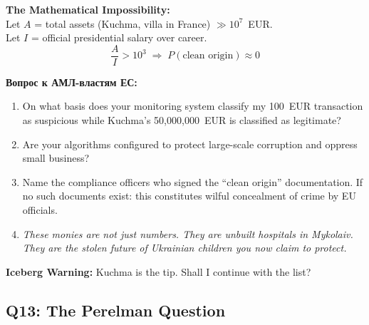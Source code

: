 \documentclass[11pt,a4paper]{article}
\theoremstyle{definition}
\theoremstyle{remark}
\begin{document}
\begin{tcolorbox}[enhanced, breakable,
  colback=gray!5, colframe=black!60,
  title={\textbf{Q12 — The Kuchma Mathematical Trap:}
    \textit{AML for whom?}},
  fonttitle=\bfseries, boxrule=1pt]

\textbf{The Mathematical Impossibility:}\\
Let $A$ = total assets (Kuchma, villa in France) $\gg 10^7$~EUR.\\
Let $I$ = official presidential salary over career.\\[0.1cm]
\[
  \frac{A}{I} > 10^3
  \;\Rightarrow\;
  P(\text{clean origin}) \approx 0
\]

\foreignlanguage{russian}{
\textbf{Вопрос к АМЛ-властям ЕС:}\\[0.1cm]
}
\begin{enumerate}[noitemsep, leftmargin=1.5cm]
  \item On what basis does your monitoring system
    classify my 100~EUR transaction as suspicious
    while Kuchma's 50{,}000{,}000~EUR is classified as legitimate?

  \item Are your algorithms configured to protect
    large-scale corruption and oppress small business?

  \item Name the compliance officers who signed
    the ``clean origin'' documentation.
    If no such documents exist: this constitutes
    wilful concealment of crime by EU officials.

  \item \textit{These monies are not just numbers.
    They are unbuilt hospitals in Mykolaiv.
    They are the stolen future of Ukrainian children
    you now claim to protect.}
\end{enumerate}

\textbf{Iceberg Warning:}
Kuchma is the tip. Shall I continue with the list?
\end{tcolorbox}

\subsection{Q13: The Perelman Question}
\label{sec:q13}
\end{document}
